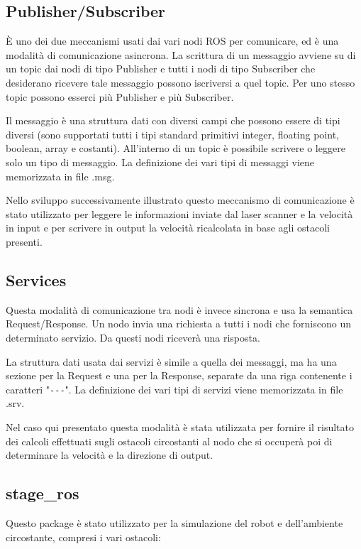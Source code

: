 \documentclass[Lau, binding=0.6cm, oneside]{sapthesis}
\begin{document}
\subsection{Publisher/Subscriber}
È uno dei due meccanismi usati dai vari nodi ROS per comunicare, ed è una modalità di comunicazione asincrona.
La scrittura di un messaggio avviene su di un topic dai nodi di tipo Publisher e tutti i nodi di tipo Subscriber che desiderano ricevere tale messaggio possono iscriversi a quel topic.
Per uno stesso topic possono esserci più Publisher e più Subscriber.

Il messaggio è una struttura dati con diversi campi che possono essere di tipi diversi (sono supportati tutti i tipi standard primitivi integer, floating point, boolean, array e costanti).
All’interno di un topic è possibile scrivere o leggere solo un tipo di messaggio.
La definizione dei vari tipi di messaggi viene memorizzata in file .msg.

Nello sviluppo successivamente illustrato questo meccanismo di comunicazione è stato utilizzato per leggere le informazioni inviate dal laser scanner e la velocità in input e per scrivere in output la velocità ricalcolata in base agli ostacoli presenti.

\subsection{Services}
Questa modalità di comunicazione tra nodi è invece sincrona e usa la semantica Request/Response.
Un nodo invia una richiesta a tutti i nodi che forniscono un determinato servizio.
Da questi nodi riceverà una risposta.

La struttura dati usata dai servizi è simile a quella dei messaggi, ma ha una sezione per la Request e una per la Response, separate da una riga contenente i caratteri "\lstinline{---}".
La definizione dei vari tipi di servizi viene memorizzata in file .srv.

Nel caso qui presentato questa modalità è stata utilizzata per fornire il risultato dei calcoli effettuati sugli ostacoli circostanti al nodo che si occuperà poi di determinare la velocità e la direzione di output.

\subsection{stage\_ros}
Questo package è stato utilizzato per la simulazione del robot e dell'ambiente circostante, compresi i vari ostacoli:
\end{document}
